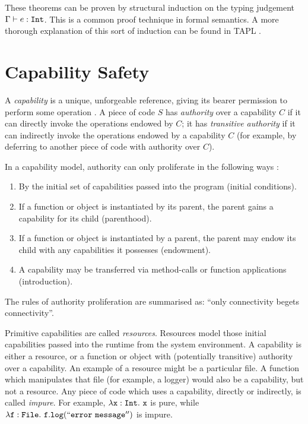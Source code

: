 These theorems can be proven by structural induction on the typing judgement $\Gamma \vdash e: \mathtt{Int}$. This is a common proof technique in formal semantics. A more thorough explanation of this sort of induction can be found in TAPL \cite[p. 31]{tapl}.


\section{Capability Safety}

A \textit{capability} is a unique, unforgeable reference, giving its bearer permission to perform some operation \cite{dennis66}. A piece of code $S$ has \textit{authority} over a capability $C$ if it can directly invoke the operations endowed by $C$; it has \textit{transitive authority} if it can indirectly invoke the operations endowed by a capability $C$ (for example, by deferring to another piece of code with authority over $C$).

In a capability model, authority can only proliferate in the following ways \cite{miller06}:

\begin{enumerate}
	\item By the initial set of capabilities passed into the program (initial conditions).
	\item If a function or object is instantiated by its parent, the parent gains a capability for its child (parenthood).
	\item If a function or object is instantiated by a parent, the parent may endow its child with any capabilities it possesses (endowment).
	\item A capability may be transferred via method-calls or function applications (introduction).
\end{enumerate}

The rules of authority proliferation are summarised as: ``only connectivity begets connectivity''.

Primitive capabilities are called \textit{resources}. Resources model those initial capabilities passed into the runtime from the system environment. A capability is either a resource, or a function or object with (potentially transitive) authority over a capability. An example of a resource might be a particular file. A function which manipulates that file (for example, a logger) would also be a capability, but not a resource. Any piece of code which uses a capability, directly or indirectly, is called \textit{impure}. For example, $\mathtt{\lambda x: \mathtt{Int} .~x}$ is pure, while $\mathtt{\lambda f: File .~f.log(``error~message'')}$ is impure.

